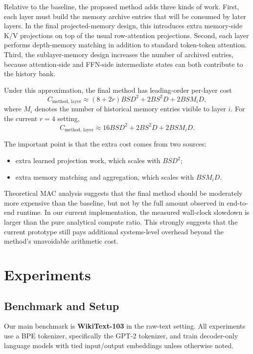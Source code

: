 \documentclass[11pt]{article}
\begin{document}
Relative to the baseline, the proposed method adds three kinds of work. First, each layer must build the memory archive entries that will be consumed by later layers. In the final projected-memory design, this introduces extra memory-side K/V projections on top of the usual row-attention projections. Second, each layer performs depth-memory matching in addition to standard token-token attention. Third, the sublayer-memory design increases the number of archived entries, because attention-side and FFN-side intermediate states can both contribute to the history bank.

Under this approximation, the final method has leading-order per-layer cost
\[
C_{\text{method, layer}} \approx (8 + 2r)BSD^2 + 2BS^2D + 2BSM_iD,
\]
where $M_i$ denotes the number of historical memory entries visible to layer $i$. For the current $r = 4$ setting,
\[
C_{\text{method, layer}} \approx 16BSD^2 + 2BS^2D + 2BSM_iD.
\]

The important point is that the extra cost comes from two sources:
\begin{itemize}[leftmargin=1.5em]
    \item extra learned projection work, which scales with $BSD^2$;
    \item extra memory matching and aggregation, which scales with $BSM_iD$.
\end{itemize}

Theoretical MAC analysis suggests that the final method should be moderately more expensive than the baseline, but not by the full amount observed in end-to-end runtime. In our current implementation, the measured wall-clock slowdown is larger than the pure analytical compute ratio. This strongly suggests that the current prototype still pays additional systems-level overhead beyond the method's unavoidable arithmetic cost.

\section{Experiments}

\subsection{Benchmark and Setup}

Our main benchmark is \textbf{WikiText-103} in the raw-text setting. All experiments use a BPE tokenizer, specifically the GPT-2 tokenizer, and train decoder-only language models with tied input/output embeddings unless otherwise noted.
\end{document}
